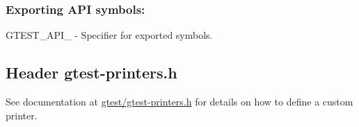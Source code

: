 \subsubsection*{Exporting A\+PI symbols\+:}


\begin{DoxyItemize}
\item {\ttfamily G\+T\+E\+S\+T\+\_\+\+A\+P\+I\+\_\+} -\/ Specifier for exported symbols.
\end{DoxyItemize}

\subsection*{Header {\ttfamily gtest-\/printers.\+h}}


\begin{DoxyItemize}
\item See documentation at {\ttfamily \mbox{\hyperlink{gtest-printers_8h_source}{gtest/gtest-\/printers.\+h}}} for details on how to define a custom printer. 
\end{DoxyItemize}